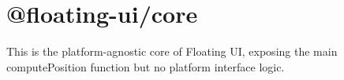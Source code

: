 \chapter{@floating-\/ui/core}
\hypertarget{md__2home_2solype_2delivery_2current__days_2Mannheim_2front_2node__modules_2_0dfloating-ui_2core_2README}{}\label{md__2home_2solype_2delivery_2current__days_2Mannheim_2front_2node__modules_2_0dfloating-ui_2core_2README}
\label{md__2home_2solype_2delivery_2current__days_2Mannheim_2front_2node__modules_2_0dfloating-ui_2core_2README_autotoc_md276}%
%
 This is the platform-\/agnostic core of Floating UI, exposing the main {\ttfamily compute\+Position} function but no platform interface logic. 